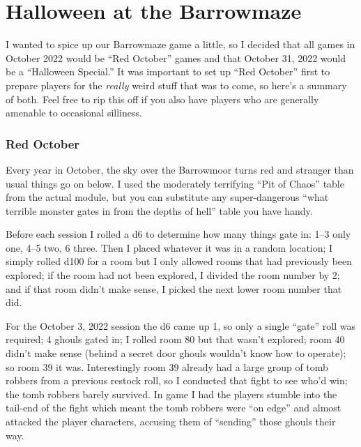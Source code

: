 
\section{Halloween at the Barrowmaze}

I wanted to spice up our Barrowmaze game a little, so I decided that all games
in October 2022 would be ``Red October'' games and that October 31, 2022 would
be a ``Halloween Special.'' It was important to set up ``Red October'' first to
prepare players for the \emph{really} weird stuff that was to come, so here's a
summary of both. Feel free to rip this off if you also have players who are
generally amenable to occasional silliness.

\subsubsection{Red October}

Every year in October, the sky over the Barrowmoor turns red and stranger than
usual things go on below. I used the moderately terrifying ``Pit of Chaos''
table from the actual module, but you can substitute any super-dangerous ``what
terrible monster gates in from the depths of hell'' table you have handy.

Before each session I rolled a d6 to determine how many things gate in: 1--3 only
one, 4--5 two, 6 three. Then I placed whatever it was in a random location; I
simply rolled d100 for a room but I only allowed rooms that had previously been
explored; if the room had not been explored, I divided the room number by 2; and
if that room didn't make sense, I picked the next lower room number that did.

For the October 3, 2022 session the d6 came up 1, so only a single ``gate'' roll
was required; 4 ghouls gated in; I rolled room 80 but that wasn't explored; room
40 didn't make sense (behind a secret door ghouls wouldn't know how to operate);
so room 39 it was.
%
Interestingly room 39 already had a large group of tomb robbers from a previous
restock roll, so I conducted that fight to see who'd win; the tomb robbers barely
survived. In game I had the players stumble into the tail-end of the fight which
meant the tomb robbers were ``on edge'' and almost attacked the player
characters, accusing them of ``sending'' those ghouls their way.


